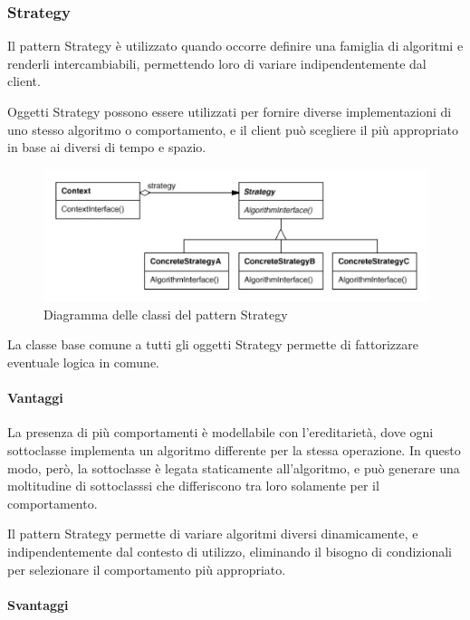 \subsubsection{Strategy}

Il pattern Strategy è utilizzato quando occorre definire una famiglia di
algoritmi e renderli intercambiabili, permettendo loro di variare
indipendentemente dal client.

Oggetti Strategy possono essere utilizzati per fornire diverse implementazioni
di uno stesso algoritmo o comportamento, e il client può scegliere il più
appropriato in base ai diversi  di tempo e spazio.

\begin{figure}[h!]
  \centering
  \includegraphics[scale=0.55]{imgs/strategy.jpg}
  \caption{Diagramma delle classi del pattern Strategy}
\end{figure}

La classe base comune a tutti gli oggetti Strategy permette di fattorizzare
eventuale logica in comune.

\paragraph{Vantaggi}

La presenza di più comportamenti è modellabile con l'ereditarietà, dove ogni
sottoclasse implementa un algoritmo differente per la stessa operazione. In
questo modo, però, la sottoclasse è legata staticamente all'algoritmo, e può
generare una moltitudine di sottoclasssi che differiscono tra loro solamente per
il comportamento.

Il pattern Strategy permette di variare algoritmi diversi dinamicamente, e
indipendentemente dal contesto di utilizzo, eliminando il bisogno di
 condizionali per selezionare il comportamento più
appropriato.

\paragraph{Svantaggi}

